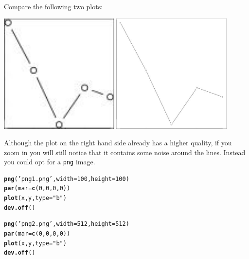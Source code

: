 \documentclass{article}\usepackage[]{graphicx}\usepackage[]{color}
\makeatletter
\newcommand{\hlnum}[1]{\textcolor[rgb]{0.686,0.059,0.569}{#1}}%
\newcommand{\hlstr}[1]{\textcolor[rgb]{0.192,0.494,0.8}{#1}}%
\newcommand{\hlstd}[1]{\textcolor[rgb]{0.345,0.345,0.345}{#1}}%
\newcommand{\hlkwc}[1]{\textcolor[rgb]{0.333,0.667,0.333}{#1}}%
\newcommand{\hlkwd}[1]{\textcolor[rgb]{0.737,0.353,0.396}{\textbf{#1}}}%
\newenvironment{kframe}{%
 \def\at@end@of@kframe{}%
 \ifinner\ifhmode%
  \def\at@end@of@kframe{\end{minipage}}%
  \begin{minipage}{\columnwidth}%
 \fi\fi%
 \def\FrameCommand##1{\hskip\@totalleftmargin \hskip-\fboxsep
 \colorbox{shadecolor}{##1}\hskip-\fboxsep
     \hskip-\linewidth \hskip-\@totalleftmargin \hskip\columnwidth}%
 \MakeFramed {\advance\hsize-\width
   \@totalleftmargin\z@ \linewidth\hsize
   \@setminipage}}%
 {\par\unskip\endMakeFramed%
 \at@end@of@kframe}
\newenvironment{knitrout}{}{} %
\makeatother
\begin{document}
\begin{mdframed}
Compare the following two plots:
\begin{center}
\includegraphics[width=0.45\textwidth]{jpg1.jpg}
\includegraphics[width=0.45\textwidth]{jpg2.jpg}
\end{center}
Although the plot on the right hand side already has a higher quality, if you zoom in you will still notice that it contains some noise around the lines. Instead you could opt for a \texttt{png} image.
\begin{knitrout}
\color{fgcolor}\begin{kframe}
\begin{alltt}
\hlkwd{png}\hlstd{(}\hlstr{'png1.png'}\hlstd{,}\hlkwc{width}\hlstd{=}\hlnum{100}\hlstd{,}\hlkwc{height}\hlstd{=}\hlnum{100}\hlstd{)}
\hlkwd{par}\hlstd{(}\hlkwc{mar}\hlstd{=}\hlkwd{c}\hlstd{(}\hlnum{0}\hlstd{,}\hlnum{0}\hlstd{,}\hlnum{0}\hlstd{,}\hlnum{0}\hlstd{))}
\hlkwd{plot}\hlstd{(x,y,}\hlkwc{type}\hlstd{=}\hlstr{"b"}\hlstd{)}
\hlkwd{dev.off}\hlstd{()}

\hlkwd{png}\hlstd{(}\hlstr{'png2.png'}\hlstd{,}\hlkwc{width}\hlstd{=}\hlnum{512}\hlstd{,}\hlkwc{height}\hlstd{=}\hlnum{512}\hlstd{)}
\hlkwd{par}\hlstd{(}\hlkwc{mar}\hlstd{=}\hlkwd{c}\hlstd{(}\hlnum{0}\hlstd{,}\hlnum{0}\hlstd{,}\hlnum{0}\hlstd{,}\hlnum{0}\hlstd{))}
\hlkwd{plot}\hlstd{(x,y,}\hlkwc{type}\hlstd{=}\hlstr{"b"}\hlstd{)}
\hlkwd{dev.off}\hlstd{()}
\end{alltt}
\end{kframe}
\end{knitrout}


\end{mdframed}
\end{document}
